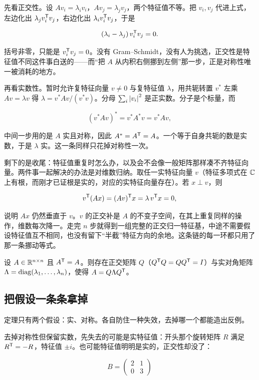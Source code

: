 先看正交性。设 \(Av_i=\lambda_iv_i\)，\(Av_j=\lambda_jv_j\)，两个特征值不等。把 \(v_i,v_j\) 代进上式，左边化出 \(\lambda_jv_i^{\mathsf{T}}v_j\)，右边化出 \(\lambda_iv_i^{\mathsf{T}}v_j\)，于是

\[
(\lambda_i-\lambda_j)\,v_i^{\mathsf{T}}v_j=0 .
\]

括号非零，只能是 \(v_i^{\mathsf{T}}v_j=0\)。没有 Gram--Schmidt，没有人为挑选，正交性是特征值不同这件事白送的——而``把 \(A\) 从内积右侧挪到左侧''那一步，正是对称性唯一被消耗的地方。

再看实数性。暂时允许复特征向量 \(v\ne0\) 与复特征值 \(\lambda\)，用共轭转置 \(v^*\) 左乘 \(Av=\lambda v\) 得 \(\lambda=v^*Av/(v^*v)\)。分母 \(\sum_i\left|v_i\right|^2\) 是正实数。分子是个标量，而

\[
(v^*Av)^*=v^*A^*v=v^*Av,
\]

中间一步用的是 \(A\) 实且对称，因此 \(A^*=A^{\mathsf{T}}=A\)。一个等于自身共轭的数是实数，于是 \(\lambda\) 实。这一条同样只花掉对称性一次。

剩下的是收尾：特征值重复时怎么办，以及会不会像一般矩阵那样凑不齐特征向量。两件事一起解决的办法是对维数归纳。取任一实特征向量 \(v\)（特征多项式在 \(\mathbb{C}\) 上有根，而刚才已证根是实的，对应的实特征向量存在）。若 \(x\perp v\)，则

\[
v^{\mathsf{T}}(Ax)=(Av)^{\mathsf{T}}x=\lambda\,v^{\mathsf{T}}x=0,
\]

说明 \(Ax\) 仍然垂直于 \(v\)。\(v\) 的正交补是 \(A\) 的不变子空间，在其上重复同样的操作，维数每次降一。走完 \(n\) 步就得到一组完整的正交归一特征基，中途不需要假设特征值互不相同，也没有留下``半截''特征方向的余地。这条链的每一环都只用了那一条挪动等式。

\begin{theorem}[实对称矩阵的谱定理]
设 \(A\in\mathbb{R}^{n\times n}\) 且 \(A^{\mathsf{T}}=A\)。则存在正交矩阵 \(Q\)（\(Q^{\mathsf{T}}Q=QQ^{\mathsf{T}}=I\)）与实对角矩阵 \(\Lambda=\operatorname{diag}(\lambda_1,\ldots,\lambda_n)\)，使得 \(A=Q\Lambda Q^{\mathsf{T}}\)。
\end{theorem}

\subsection{把假设一条条拿掉}

定理只有两个假设：实、对称。各自防住一种失效，去掉哪一个都能造出反例。

去掉对称性但保留实数，先失去的可能是实特征值：开头那个旋转矩阵 \(R\) 满足 \(R^{\mathsf{T}}=-R\)，特征值 \(\pm i\)。也可能特征值明明是实的，正交性却没了：

\[
B=\begin{pmatrix}2&1\\0&3\end{pmatrix}
\]

